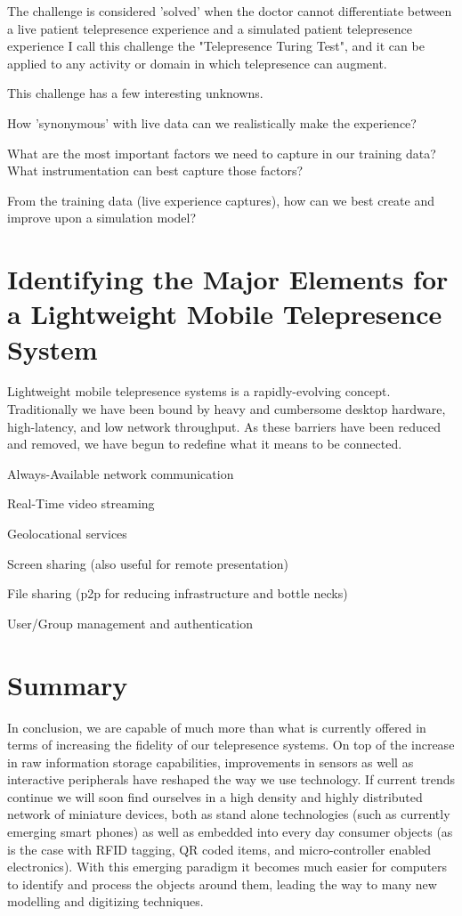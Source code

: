 \documentclass[a4paper,12pt]{report}
\begin{document}
The challenge is considered 'solved' when the doctor cannot differentiate between a live patient telepresence experience and a simulated patient telepresence experience
I call this challenge the "Telepresence Turing Test", and it can be applied to any activity or domain in which telepresence can augment.

This challenge has a few interesting unknowns.

How 'synonymous' with live data can we realistically make the experience?

What are the most important factors we need to capture in our training data? What instrumentation can best capture those factors?

From the training data (live experience captures), how can we best create and improve upon a simulation model?\cite{391769} 

\section{Identifying the Major Elements for a Lightweight Mobile Telepresence System}

Lightweight mobile telepresence systems is a rapidly-evolving concept. Traditionally we have been bound by heavy and cumbersome desktop hardware, high-latency, and low network throughput. As these barriers have been reduced and removed, we have begun to redefine what it means to be connected.

Always-Available network communication

Real-Time video streaming

Geolocational services

Screen sharing (also useful for remote presentation)

File sharing (p2p for reducing infrastructure and bottle necks)

User/Group management and authentication

\section{Summary}

In conclusion, we are capable of much more than what is currently offered in terms of increasing the fidelity of our telepresence systems. On top of the increase in raw information storage capabilities, improvements in sensors as well as interactive peripherals have reshaped the way we use technology. If current trends continue we will soon find ourselves in a high density and highly distributed network of miniature devices, both as stand alone technologies (such as currently emerging smart phones) as well as embedded into every day consumer objects (as is the case with RFID tagging, QR coded items, and micro-controller enabled electronics). With this emerging paradigm it becomes much easier for computers to identify and process the objects around them, leading the way to many new modelling and digitizing techniques.
\end{document}
